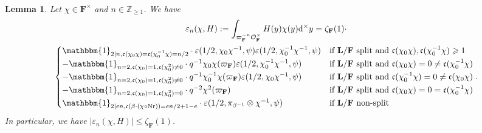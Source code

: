 \documentclass[A4]{amsart}
\def\leq{\leqslant}
\def\geq{\geqslant}
\newtheorem{lemma}      [theorem]{Lemma}
\numberwithin{equation}{section} \everymath{\displaystyle}
\newcommand{\Nr}{{\rm Nr}}
\newcommand{\Z}{\mathbb{Z}}
\newcommand{\id}{\mathbbm{1}}
\newcommand{\ud}{\mathrm{d}}
\newcommand{\F}{\mathbf{F}}
\newcommand{\bL}{\mathbf{L}}
\newcommand{\vO}{\mathcal{O}}
\newcommand{\extnorm}[1]{\left\lvert #1 \right\rvert}
\newcommand{\cond}{\mathfrak{c}}
\begin{document}
\begin{lemma} \label{lem: TestFMellin}
	Let $\chi \in \widehat{\F^{\times}}$ and $n \in \Z_{\geq 1}$. We have
\begin{multline*} 
	\varepsilon_n(\chi,H) := \int_{\varpi_{\F}^{-n} \vO_{\F}^{\times}} H(y) \chi(y) \ud^{\times} y = \zeta_{\F}(1) \cdot \\
	\begin{cases}
		\id_{2 \mid n, \cond(\chi_0\chi) = \cond(\chi_0^{-1}\chi) = n/2} \cdot \varepsilon(1/2,\chi_0 \chi^{-1}, \psi) \varepsilon(1/2,\chi_0^{-1} \chi^{-1}, \psi) & \text{if } \bL/\F \text{ split and } \cond(\chi_0\chi), \cond(\chi_0^{-1}\chi) \geq 1 \\
		- \id_{n = 2, \cond(\chi_0)=1, \cond(\chi_0^2) \neq 0} \cdot q^{-1} \chi_0\chi(\varpi_{\F}) \varepsilon(1/2,\chi_0^{-1} \chi^{-1}, \psi) & \text{if } \bL/\F \text{ split and } \cond(\chi_0\chi) = 0 \neq \cond(\chi_0^{-1}\chi) \\
		- \id_{n = 2, \cond(\chi_0)=1, \cond(\chi_0^2) \neq 0} \cdot q^{-1} \chi_0^{-1}\chi(\varpi_{\F}) \varepsilon(1/2,\chi_0 \chi^{-1}, \psi) & \text{if } \bL/\F \text{ split and } \cond(\chi_0^{-1}\chi) = 0 \neq \cond(\chi_0\chi) \\
		- \id_{n = 2, \cond(\chi_0)=1, \cond(\chi_0^2)=0} \cdot q^{-2} \chi^2(\varpi_{\F}) & \text{if } \bL/\F \text{ split and } \cond(\chi_0\chi) = 0 = \cond(\chi_0^{-1}\chi) \\
		\id_{2 \mid en, \cond(\beta \cdot (\chi \circ \Nr)) = en/2+1-e} \cdot \varepsilon(1/2, \pi_{\beta^{-1}} \otimes \chi^{-1}, \psi) & \text{if } \bL/\F \text{ non-split}
	\end{cases}.
\end{multline*}
	In particular, we have $\extnorm{\varepsilon_n(\chi,H)} \leq \zeta_{\F}(1)$.
\end{lemma}
\end{document}
